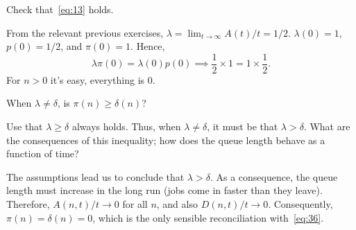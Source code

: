 \begin{exercise}\label{ex:l-152}
 Check that~\cref{eq:13} holds.
\begin{solution}
From the relevant previous exercises, $\lambda = \lim_{t\to\infty} A(t)/t = 1/2$. $\lambda(0)=1$, $p(0)=1/2$, and $\pi(0)=1$. Hence,
\begin{equation*}
 \lambda \pi(0) = \lambda(0) p(0) \implies \frac 1 2 \times 1 = 1\times \frac 1 2.
\end{equation*}
For $n>0$ it's easy, everything is 0.
\end{solution}
\end{exercise}

\begin{exercise}\label{ex:26}
 When $\lambda\neq \delta$, is $\pi(n)\geq \delta(n)$? 
\begin{hint}
 Use that $\lambda \geq \delta$ always holds. Thus, when $\lambda \neq \delta$, it must be that $\lambda > \delta$. What are the consequences of this inequality; how does the queue length behave as a function of time?
\end{hint}
\begin{solution}
 The assumptions lead us to conclude that $\lambda > \delta$. As a consequence, the queue length must increase in the long run (jobs come in faster than they leave). Therefore, $A(n,t)/t \to 0$ for all $n$, and also $D(n,t)/t\to 0$. Consequently, $\pi(n) = \delta(n) = 0$, which is the only sensible reconciliation with~\cref{eq:36}. 
\end{solution}
\end{exercise}



